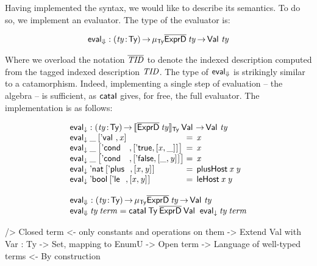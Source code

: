 Having implemented the syntax, we would like to describe its
semantics. To do so, we implement an evaluator. The type of the
evaluator is:

\[
\evalH : \PI{\V{ty}}{\Ty} 
         \IMu{\Ty}{\toIDesc{\HExprD}}{\V{ty}} \To
         \Val{\V{ty}}
\]


Where we overload the notation $\toIDesc{\V{TID}}$ to denote the
indexed description computed from the tagged indexed description
$\V{TID}$. The type of $\evalH$ is strikingly similar to a
catamorphism. Indeed, implementing a single step of evaluation -- the
algebra -- is sufficient, as $\F{cataI}$ gives, for free, the full
evaluator. The implementation is as follows:


\[\stk{
\evalOne : \PI{\V{ty}}{\Ty} \idescop{\toIDesc{\HExprD}\:\V{ty}}{\Ty}{\Val{\!}}
\To {\Val{\V{ty}}} \\
\begin{array}{@{}l@{\:=\:\:}l}
\evalOne\: \_\: \pair{\Eval{}}{\V{x}}{}                                         & \V{x} \\
\evalOne\: \_\: \pair{\Econd{}{}{}}{\pair{\BoolTrue}{\pair{\V{x}}{\_}{}}{}}{}   & \V{x} \\
\evalOne\: \_\: \pair{\Econd{}{}{}}{\pair{\BoolFalse}{\pair{\_}{\V{y}}{}}{}}{}  & \V{x} \\
\evalOne\: \Enat\: \pair{\Eplus{}{}}{\pair{\V{x}}{\V{y}}{}}{}                       & \F{plusHost}\: \V{x}\: \V{y} \\
\evalOne\: \Ebool\: \pair{\Ele{}{}}{\pair{\V{x}}{\V{y}}{}}{}                        & \F{leHost}\: \V{x}\: \V{y} 
\end{array} \\
\\
\evalH : \PI{\V{ty}}{\Ty} 
           \IMu{\Ty}{\toIDesc{\HExprD}}{\V{ty}} \To
           \Val{\V{ty}} \\
\evalH\: \V{ty}\: \V{term} = \F{cataI}\: \Ty\: 
                                 \toIDesc{\HExprD}\: 
                                 \Val{}\: 
                                 \evalOne\: 
                                 \V{ty}\: 
                                 \V{term}
}\]

\begin{wstructure}
    /> Closed term
        <- only constants and operations on them
        -> Extend Val with Var : Ty -> Set, mapping to EnumU
            -> Open term
            -> Language of well-typed terms
                <- By construction
\end{wstructure}

